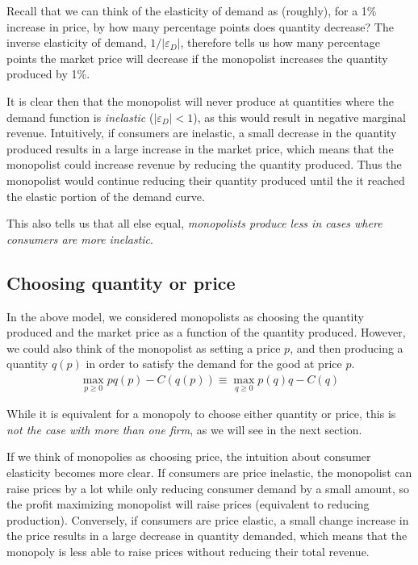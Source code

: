 Recall that we can think of the elasticity of demand as (roughly), for a 1\% increase in price, by how many percentage points does quantity decrease? The inverse elasticity of demand, $1/|\varepsilon_D|$, therefore tells us how many percentage points the market price will decrease if the monopolist increases the quantity produced by 1\%. 

It is clear then that the monopolist will never produce at quantities where the demand function is \emph{inelastic} ($|\varepsilon_D| < 1$), as this would result in negative marginal revenue. Intuitively, if consumers are inelastic, a small decrease in the quantity produced results in a large increase in the market price, which means that the monopolist could increase revenue by reducing the quantity produced. Thus the monopolist would continue reducing their quantity produced until the it reached the elastic portion of the demand curve.

This also tells us that all else equal, \emph{monopolists produce less in cases where consumers are more inelastic}. 

\subsection*{Choosing quantity or price}
In the above model, we considered monopolists as choosing the quantity produced and the market price as a function of the quantity produced. However, we could also think of the monopolist as setting a price $p$, and then producing a quantity $q(p)$ in order to satisfy the demand for the good at price $p$.
\begin{align*}
    \max_{p \geq 0} p q(p) - C(q(p)) \equiv \max_{q \geq 0} p(q) q - C(q)
\end{align*}

While it is equivalent for a monopoly to choose either quantity or price, this is \emph{not the case with more than one firm}, as we will see in the next section. 

If we think of monopolies as choosing price, the intuition about consumer elasticity becomes more clear. If consumers are price inelastic, the monopolist can raise prices by a lot while only reducing consumer demand by a small amount, so the profit maximizing monopolist will raise prices (equivalent to reducing production). Conversely, if consumers are price elastic, a small change increase in the price results in a large decrease in quantity demanded, which means that the monopoly is less able to raise prices without reducing their total revenue.


